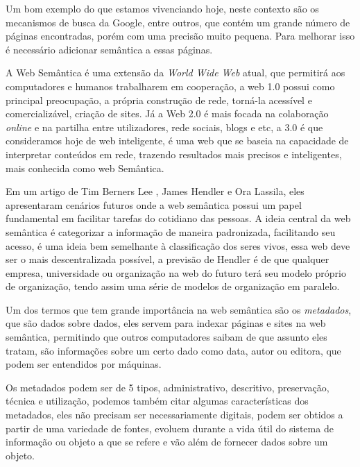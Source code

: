 Um bom exemplo do que estamos vivenciando hoje, neste contexto são os mecanismos de busca da Google, entre outros, que contém um grande número de páginas encontradas, porém com uma precisão muito pequena. Para melhorar isso é necessário adicionar semântica a essas páginas.

A Web Semântica é uma extensão da \textit{World Wide Web} atual, que permitirá aos computadores e humanos trabalharem em cooperação, a web 1.0 possui como principal preocupação, a própria construção de rede, torná-la acessível e comercializável, criação de sites. Já a Web 2.0 é mais focada na colaboração \textit{online} e na partilha entre utilizadores, rede sociais, blogs e etc, a 3.0 é que consideramos hoje de web inteligente, é uma web que se baseia na capacidade de interpretar conteúdos em rede, trazendo resultados mais precisos e inteligentes, mais conhecida como web Semântica.

Em um artigo de Tim Berners Lee \cite{berners2001semantic}, James Hendler e Ora Lassila, eles apresentaram cenários futuros onde a web semântica possui um papel fundamental em facilitar tarefas do cotidiano das pessoas. A ideia central da web semântica é categorizar a informação de maneira padronizada, facilitando seu acesso, é uma ideia bem semelhante à classificação dos seres vivos, essa web deve ser o mais descentralizada possível, a previsão de Hendler é de que qualquer empresa, universidade ou organização na web do futuro terá seu modelo próprio de organização, tendo assim uma série de modelos de organização em paralelo.

Um dos termos que tem grande importância na web semântica são os \textit{metadados}, que são dados sobre dados, eles servem para indexar páginas e sites na web semântica, permitindo que outros computadores saibam de que assunto eles tratam, são informações sobre um certo dado como data, autor ou editora, que podem ser entendidos por máquinas.

Os metadados podem ser de 5 tipos, administrativo, descritivo, preservação, técnica e utilização, podemos também citar algumas características dos metadados, eles não precisam ser necessariamente digitais, podem ser obtidos a partir de uma variedade de fontes, evoluem durante a vida útil do sistema de informação ou objeto a que se refere e vão além de fornecer dados sobre um objeto.


